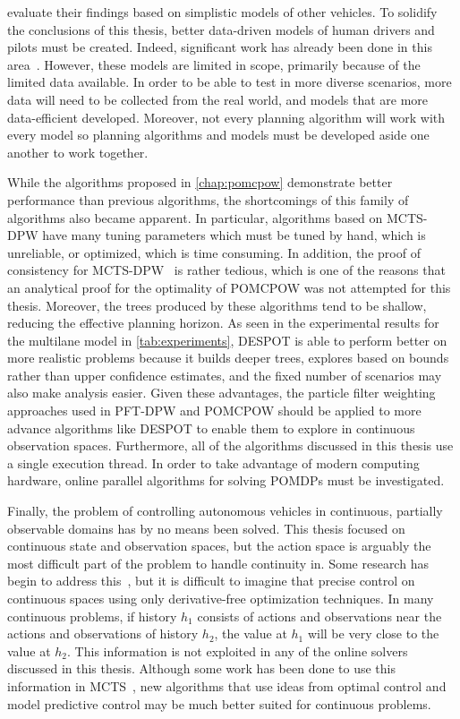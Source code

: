 evaluate their findings based on simplistic models of other vehicles.
To solidify the conclusions of this thesis, better data-driven models of human drivers and pilots must be created.
Indeed, significant work has already been done in this area~\cite{schmerling2018multimodal,bhattacharyya2018reward}. 
However, these models are limited in scope, primarily because of the limited data available.
In order to be able to test in more diverse scenarios, more data will need to be collected from the real world, and models that are more data-efficient developed.
Moreover, not every planning algorithm will work with every model so planning algorithms and models must be developed aside one another to work together.

While the algorithms proposed in \cref{chap:pomcpow} demonstrate better performance than previous algorithms, the shortcomings of this family of algorithms also became apparent.
In particular, algorithms based on MCTS-DPW have many tuning parameters which must be tuned by hand, which is unreliable, or optimized, which is time consuming.
In addition, the proof of consistency for MCTS-DPW~\cite{auger2013continuous} is rather tedious, which is one of the reasons that an analytical proof for the optimality of POMCPOW was not attempted for this thesis.
Moreover, the trees produced by these algorithms tend to be shallow, reducing the effective planning horizon.
As seen in the experimental results for the multilane model in \cref{tab:experiments}, DESPOT is able to perform better on more realistic problems because it builds deeper trees, explores based on bounds rather than upper confidence estimates, and the fixed number of scenarios may also make analysis easier.
Given these advantages, the particle filter weighting approaches used in PFT-DPW and POMCPOW should be applied to more advance algorithms like DESPOT to enable them to explore in continuous observation spaces.
Furthermore, all of the algorithms discussed in this thesis use a single execution thread. In order to take advantage of modern computing hardware, online parallel algorithms for solving POMDPs must be investigated.

Finally, the problem of controlling autonomous vehicles in continuous, partially observable domains has by no means been solved.
This thesis focused on continuous state and observation spaces, but the action space is arguably the most difficult part of the problem to handle continuity in.
Some research has begin to address this~\cite{seiler2015online,wang2018online}, but it is difficult to imagine that precise control on continuous spaces using only derivative-free optimization techniques.
In many continuous problems, if history $h_1$ consists of actions and observations near the actions and observations of history $h_2$, the value at $h_1$ will be very close to the value at $h_2$.
This information is not exploited in any of the online solvers discussed in this thesis.
Although some work has been done to use this information in MCTS~\cite{xiao2018memory}, new algorithms that use ideas from optimal control and model predictive control may be much better suited for continuous problems.

